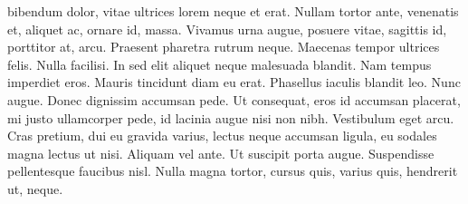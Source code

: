 bibendum dolor, vitae ultrices lorem neque et erat. Nullam tortor ante, venenatis et, aliquet ac, ornare id, massa. Vivamus urna augue, posuere vitae, sagittis id, porttitor at, arcu. Praesent pharetra rutrum neque. Maecenas tempor ultrices felis.
Nulla facilisi. In sed elit aliquet neque malesuada blandit. Nam tempus imperdiet eros. Mauris tincidunt diam eu erat. Phasellus iaculis blandit leo. Nunc augue. Donec dignissim accumsan pede. Ut consequat, eros id accumsan placerat, mi justo ullamcorper pede, id lacinia augue nisi non nibh. Vestibulum eget arcu. Cras pretium, dui eu gravida varius, lectus neque accumsan ligula, eu sodales magna lectus ut nisi. Aliquam vel ante. Ut suscipit porta augue. Suspendisse pellentesque faucibus nisl. Nulla magna tortor, cursus quis, varius quis, hendrerit ut, neque.

